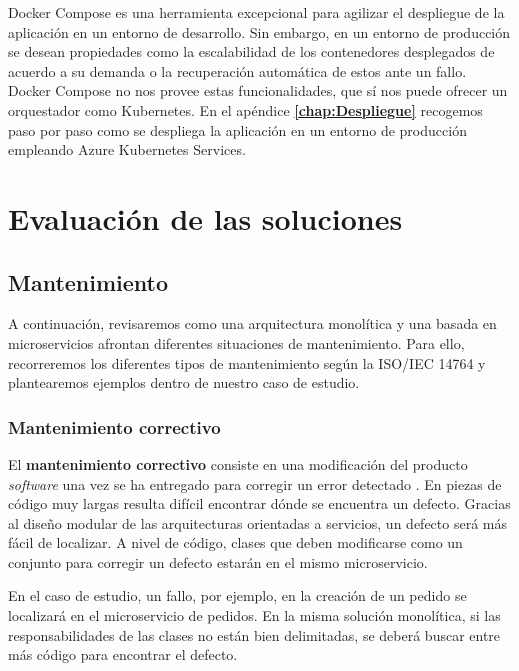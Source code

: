 \documentclass[11pt,spanish,listoffigures]{tfgetsinf}
\begin{document}
Docker Compose es una herramienta excepcional para agilizar el despliegue de la aplicación en un entorno de desarrollo. Sin embargo, en un entorno de producción se desean propiedades como la escalabilidad de los contenedores desplegados de acuerdo a su demanda o la recuperación automática de estos ante un fallo. Docker Compose no nos provee estas funcionalidades, que sí nos puede ofrecer un orquestador como Kubernetes. En el apéndice \textbf{\ref{chap:Despliegue} } recogemos paso por paso como se despliega la aplicación en un entorno de producción empleando Azure Kubernetes Services.

%

\chapter{Evaluación de las soluciones}

\section{Mantenimiento} \label{sect:Mantenimiento}

A continuación, revisaremos como una arquitectura monolítica y una basada en microservicios afrontan diferentes situaciones de mantenimiento. Para ello, recorreremos los diferentes tipos de mantenimiento según la ISO/IEC 14764 y plantearemos ejemplos dentro de nuestro caso de estudio. 

\subsection{Mantenimiento correctivo}

El \textbf{mantenimiento correctivo} consiste en una modificación del producto \textit{software} una vez se ha entregado para corregir un error detectado \cite{Bourque2014}. En piezas de código muy largas resulta difícil encontrar dónde se encuentra un defecto. Gracias al diseño modular de las arquitecturas orientadas a servicios, un defecto será más fácil de localizar. A nivel de código, clases que deben modificarse como un conjunto para corregir un defecto estarán en el mismo microservicio.

En el caso de estudio, un fallo, por ejemplo, en la creación de un pedido se localizará en el microservicio de pedidos. En la misma solución monolítica, si las responsabilidades de las clases no están bien delimitadas, se deberá buscar entre más código para encontrar el defecto.
\end{document}
